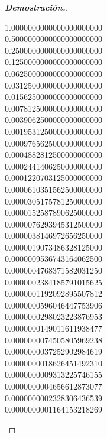 \documentclass{article}
\begin{document}
\begin{enumerate}
\begin{mdframed}[
			      linecolor=darkgray,
			      backgroundcolor=white]
\begin{proof}[\textbf{Demostraci\'on.}]
\begin{center}
				      1.0000000000000000000000\\
				      0.5000000000000000000000\\
				      0.2500000000000000000000\\
				      0.1250000000000000000000\\
				      0.0625000000000000000000\\
				      0.0312500000000000000000\\
				      0.0156250000000000000000\\
				      0.0078125000000000000000\\
				      0.0039062500000000000000\\
				      0.0019531250000000000000\\
				      0.0009765625000000000000\\
				      0.0004882812500000000000\\
				      0.0002441406250000000000\\
				      0.0001220703125000000000\\
				      0.0000610351562500000000\\
				      0.0000305175781250000000\\
				      0.0000152587890625000000\\
				      0.0000076293945312500000\\
				      0.0000038146972656250000\\
				      0.0000019073486328125000\\
				      0.0000009536743164062500\\
				      0.0000004768371582031250\\
				      0.0000002384185791015625\\
				      0.0000001192092895507812\\
				      0.0000000596046447753906\\
				      0.0000000298023223876953\\
				      0.0000000149011611938477\\
				      0.0000000074505805969238\\
				      0.0000000037252902984619\\
				      0.0000000018626451492310\\
				      0.0000000009313225746155\\
				      0.0000000004656612873077\\
				      0.0000000002328306436539\\
				      0.0000000001164153218269\\

\end{center}
\end{proof}
\end{mdframed}
\end{enumerate}
\end{document}
